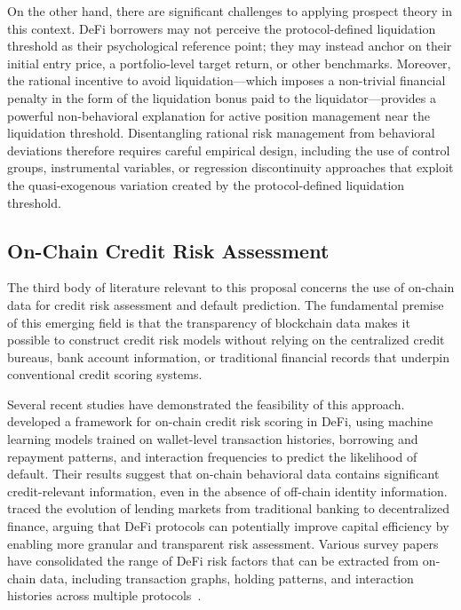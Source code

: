 On the other hand, there are significant challenges to applying prospect theory in this context. DeFi borrowers may not perceive the protocol-defined liquidation threshold as their psychological reference point; they may instead anchor on their initial entry price, a portfolio-level target return, or other benchmarks. Moreover, the rational incentive to avoid liquidation—which imposes a non-trivial financial penalty in the form of the liquidation bonus paid to the liquidator—provides a powerful non-behavioral explanation for active position management near the liquidation threshold. Disentangling rational risk management from behavioral deviations therefore requires careful empirical design, including the use of control groups, instrumental variables, or regression discontinuity approaches that exploit the quasi-exogenous variation created by the protocol-defined liquidation threshold.

\subsection{On-Chain Credit Risk Assessment}

The third body of literature relevant to this proposal concerns the use of on-chain data for credit risk assessment and default prediction. The fundamental premise of this emerging field is that the transparency of blockchain data makes it possible to construct credit risk models without relying on the centralized credit bureaus, bank account information, or traditional financial records that underpin conventional credit scoring systems.

Several recent studies have demonstrated the feasibility of this approach. \citet{ghosh2024onchain} developed a framework for on-chain credit risk scoring in DeFi, using machine learning models trained on wallet-level transaction histories, borrowing and repayment patterns, and interaction frequencies to predict the likelihood of default. Their results suggest that on-chain behavioral data contains significant credit-relevant information, even in the absence of off-chain identity information. \citet{xu2021banks} traced the evolution of lending markets from traditional banking to decentralized finance, arguing that DeFi protocols can potentially improve capital efficiency by enabling more granular and transparent risk assessment. Various survey papers have consolidated the range of DeFi risk factors that can be extracted from on-chain data, including transaction graphs, holding patterns, and interaction histories across multiple protocols~\cite{werner2022sok, jiang2023defi}.

